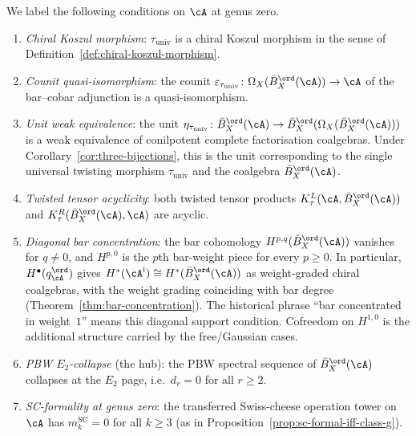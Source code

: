 \begin{definition}\label{def:seven-conditions-g0}
We label the following conditions on $\cA$ at genus zero.
\begin{enumerate}[label=\textup{(\roman*)}]
\item\label{seven:koszul}
\emph{Chiral Koszul morphism}: $\tau_{\mathrm{univ}}$ is a chiral Koszul
morphism in the sense of Definition~\ref{def:chiral-koszul-morphism}.
\item\label{seven:counit-qi}
\emph{Counit quasi-isomorphism}: the counit
$\varepsilon_{\tau_{\mathrm{univ}}} \colon \Omega_X(\bar B^{\ord}_X(\cA))
\to \cA$ of the bar--cobar adjunction is a quasi-isomorphism.
\item\label{seven:unit-we}
\emph{Unit weak equivalence}: the unit
$\eta_{\tau_{\mathrm{univ}}} \colon \bar B^{\ord}_X(\cA) \to
\bar B^{\ord}_X(\Omega_X(\bar B^{\ord}_X(\cA)))$ is a weak equivalence
of conilpotent complete factorisation coalgebras.  Under
Corollary~\ref{cor:three-bijections}, this is the unit corresponding
to the single universal twisting morphism
$\tau_{\mathrm{univ}}$ and the coalgebra
$\bar B^{\ord}_X(\cA)$.
\item\label{seven:ttacyclic}
\emph{Twisted tensor acyclicity}: both twisted tensor products
$K_\tau^L(\cA, \bar B^{\ord}_X(\cA))$ and
$K_\tau^R(\bar B^{\ord}_X(\cA), \cA)$ are acyclic.
\item\label{seven:bar-conc-wt1}
\emph{Diagonal bar concentration}: the bar cohomology
$H^{p,q}(\bar B^{\ord}_X(\cA))$ vanishes for $q \neq 0$, and
$H^{p,0}$ is the $p$th bar-weight piece for every $p \geq 0$. In
particular, $H^\bullet(q_\cA^{\ord})$ gives
$H^*(\cA^{\mathrm i})\cong
H^*(\bar B^{\ord}_X(\cA))$ as weight-graded chiral coalgebras, with
the weight grading coinciding with bar degree
\textup{(}Theorem~\ref{thm:bar-concentration}\textup{)}.  The
historical phrase ``bar concentrated in weight~$1$'' means this
diagonal support condition.  Cofreedom on $H^{1,0}$ is the additional
structure carried by the free/Gaussian cases.
\item\label{seven:pbw-e2}
\emph{PBW $E_2$-collapse} (the hub): the PBW spectral sequence of
$\bar B^{\ord}_X(\cA)$ collapses at the $E_2$ page, i.e.\
$d_r = 0$ for all $r \geq 2$.
\item\label{seven:sc-formal}
\emph{SC-formality at genus zero}: the transferred Swiss-cheese
operation tower on $\cA$ has $m_k^{\mathrm{SC}} = 0$ for all
$k \geq 3$ (as in
Proposition~\ref{prop:sc-formal-iff-class-g}).
\end{enumerate}
\end{definition}


